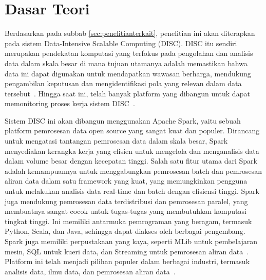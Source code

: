 \section{Dasar Teori}
\label{sec:dasarTeori}

Berdasarkan pada subbab \ref{sec:penelitianterkait},
penelitian ini akan diterapkan pada sistem Data-Intensive 
Scalable Computing (DISC). 
DISC itu sendiri merupakan pendekatan komputasi yang terfokus pada 
pengolahan dan analisis data dalam skala besar di mana tujuan 
utamanya adalah memastikan bahwa data ini dapat digunakan untuk 
mendapatkan wawasan berharga, mendukung pengambilan keputusan
dan mengidentifikasi pola yang relevan dalam data 
tersebut~\cite{dantas2020}. Hingga saat ini, telah banyak platform 
yang dibangun untuk dapat memonitoring proses kerja sistem DISC~\cite{dragan2019}.

Sistem DISC ini akan dibangun menggunakan Apache Spark, 
yaitu sebuah platform pemrosesan data open source yang 
sangat kuat dan populer. Dirancang untuk mengatasi tantangan 
pemrosesan data dalam skala besar, Spark menyediakan kerangka 
kerja yang efisien untuk mengelola dan menganalisis data dalam 
volume besar dengan kecepatan tinggi. Salah satu fitur utama 
dari Spark adalah kemampuannya untuk menggabungkan pemrosesan 
batch dan pemrosesan aliran data dalam satu framework yang 
kuat, yang memungkinkan pengguna untuk melakukan analisis data 
real-time dan batch dengan efisiensi tinggi. Spark juga mendukung 
pemrosesan data terdistribusi dan pemrosesan paralel, yang 
membuatnya sangat cocok untuk tugas-tugas yang membutuhkan 
komputasi tingkat tinggi. Ini memiliki antarmuka pemrograman 
yang beragam, termasuk Python, Scala, dan Java, sehingga dapat 
diakses oleh berbagai pengembang. Spark juga memiliki perpustakaan 
yang kaya, seperti MLib untuk pembelajaran mesin, SQL untuk kueri 
data, dan Streaming untuk pemrosesan aliran data~\cite{spark}. 
Platform ini telah menjadi pilihan populer dalam berbagai 
industri, termasuk analisis data, ilmu data, dan pemrosesan 
aliran data~\cite{shaikh2019}. 

